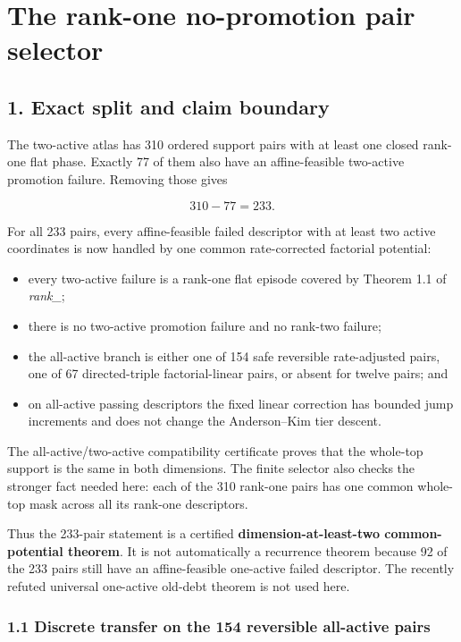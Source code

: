 \section{The rank-one no-promotion pair
selector}

\subsection{1. Exact split and claim
boundary}

The two-active atlas has 310 ordered support pairs with at least one
closed rank-one flat phase. Exactly 77 of them also have an
affine-feasible two-active promotion failure. Removing those gives

\[
 310-77=233.
\tag{1.1}
\]

For all 233 pairs, every affine-feasible failed descriptor with at least
two active coordinates is now handled by one common rate-corrected
factorial potential:

\begin{itemize}
\tightlist
\item
  every two-active failure is a rank-one flat episode covered by Theorem
  1.1 of \emph{rank\_\texttt{}};
\item
  there is no two-active promotion failure and no rank-two failure;
\item
  the all-active branch is either one of 154 safe reversible
  rate-adjusted pairs, one of 67 directed-triple factorial-linear pairs,
  or absent for twelve pairs; and
\item
  on all-active passing descriptors the fixed linear correction has
  bounded jump increments and does not change the Anderson--Kim tier
  descent.
\end{itemize}

The all-active/two-active compatibility certificate proves that the
whole-top support is the same in both dimensions. The finite selector
also checks the stronger fact needed here: each of the 310 rank-one
pairs has one common whole-top mask across all its rank-one descriptors.

Thus the 233-pair statement is a certified
\textbf{dimension-at-least-two common-potential theorem}. It is not
automatically a recurrence theorem because 92 of the 233 pairs still
have an affine-feasible one-active failed descriptor. The recently
refuted universal one-active old-debt theorem is not used here.

\subsubsection{1.1 Discrete transfer on the 154 reversible all-active
pairs}

